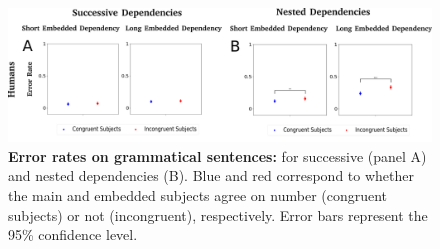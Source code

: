 \documentclass[a4paper, 11pt]{article}
\begin{document}
\begin{figure}
    \centering
    \includegraphics[width=16cm]{figures/SM/error_rates_acceptable_by_congruence.png}
    \caption{\textbf{Error rates on grammatical sentences:} for successive (panel A) and nested dependencies (B). Blue and red correspond to whether the main and embedded subjects agree on number (congruent subjects) or not (incongruent), respectively. Error bars represent the 95\% confidence level.}
    \label{fig:error_rates_all_conditions}
\end{figure}

% 


\end{document}
